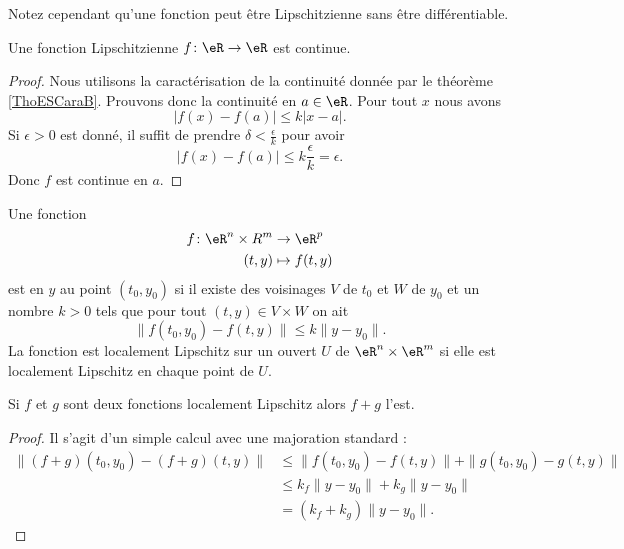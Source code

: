 Notez cependant qu'une fonction peut être Lipschitzienne sans être différentiable.

\begin{proposition} \label{PropFZgFTEW}
    Une fonction Lipschitzienne \( f\colon \eR\to \eR\) est continue.
\end{proposition}

\begin{proof}
    Nous utilisons la caractérisation de la continuité donnée par le théorème \ref{ThoESCaraB}. Prouvons donc la continuité en \( a\in \eR\). Pour tout \( x\) nous avons
    \begin{equation}
        \big| f(x)-f(a) \big|\leq k| x-a |.
    \end{equation}
    Si \( \epsilon>0\) est donné, il suffit de prendre \( \delta<\frac{ \epsilon }{ k }\) pour avoir
    \begin{equation}
        \big| f(x)-f(a) \big|\leq k\frac{ \epsilon }{ k }=\epsilon.
    \end{equation}
    Donc \( f\) est continue en \( a\).
\end{proof}

\begin{definition}      \label{DefJSFFooEOCogV}
    Une fonction 
    \begin{equation}
        \begin{aligned}
            f\colon \eR^n\times R^m&\to \eR^p \\
            (t,y)&\mapsto f(t,y) 
        \end{aligned}
    \end{equation}
    est  en \( y\) au point \( (t_0,y_0)\) si il existe des voisinages \( V\) de \( t_0\) et \( W\) de \( y_0\) et un nombre \( k>0\) tels que pour tout \( (t,y)\in V\times W\) on ait
    \begin{equation}
        \big\| f(t_0,y_0)-f(t,y) \big\|\leq k\| y-y_0 \|.
    \end{equation}
    La fonction est localement Lipschitz sur un ouvert \( U\) de \( \eR^n\times \eR^m\) si elle est localement Lipschitz en chaque point de \( U\).
\end{definition}

\begin{proposition}     \label{PropGIBZooVsIqfY}
    Si \( f\) et \( g\) sont deux fonctions localement Lipschitz alors \( f+g\) l'est.
\end{proposition}

\begin{proof}
    Il s'agit d'un simple calcul avec une majoration standard :
    \begin{subequations}
        \begin{align}
            \| (f+g)(t_0,y_0)-(f+g)(t,y) \|&\leq \|  f(t_0,y_0)-f(t,y)  \|+\| g(t_0,y_0)-g(t,y) \|\\
            &\leq k_f\| y-y_0 \|+k_g\| y-y_0 \|\\
            &=(k_f+k_g)\| y-y_0 \|.
        \end{align}
    \end{subequations}
\end{proof}

